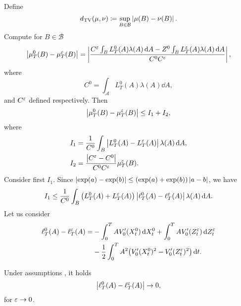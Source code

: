 \documentclass[10pt]{article}
\begin{document}
Define 
\begin{equation}
d_{\mathrm{TV}}(\mu, \nu) \coloneqq \sup_{B \in \mathcal B} \left\lvert\mu(B) - \nu(B)\right\rvert.
\end{equation}
Compute for $B \in \mathcal B$ 
\begin{equation}
\left\lvert\mu_T^0(B) - \mu_T^\varepsilon(B)\right\rvert = \left\lvert\frac{C^\varepsilon \int_B L_T^0(A) \lambda(A) \,\mathrm{d} A - Z^0 \int_B L_T^\varepsilon(A) \lambda(A) \,\mathrm{d} A}{C^0 C^\varepsilon}\right\rvert,
\end{equation}
where
\begin{equation}
C^0 = \int_{\mathcal A} L_T^0(A) \lambda(A) \dd A,
\end{equation}
and $C^\varepsilon$ defined respectively. Then
\begin{equation}
\left\lvert\mu_T^0(B) - \mu_T^\varepsilon(B)\right\rvert \leq I_1 + I_2, 
\end{equation}
where
\begin{equation}
\begin{aligned}
I_1 &= \frac{1}{C^0} \int_B \left\lvert L_T^0(A) - L_T^\varepsilon(A)\right\rvert \lambda(A) \,\mathrm{d} A, \\
I_2 &= \frac{\left\lvert C^\varepsilon - C^0\right\rvert}{C^0 C^\varepsilon} \mu_T^\varepsilon(B).
\end{aligned}
\end{equation}
Consider first $I_1$. Since $\left\lvert\exp(a) - \exp(b)\right\rvert \leq (\exp(a)+ \exp(b)) \left\lvert a - b\right\rvert$, we have
\begin{equation}
I_1 \leq \frac{1}{C^0} \int_B \big(L_T^0(A) + L_T^\varepsilon(A)\big)\left\lvert\ell_T^0(A) - \ell_T^\varepsilon(A)\right\rvert \lambda(A) \,\mathrm{d} A.
\end{equation}
Let us consider
\begin{equation}
\begin{aligned}
\ell_T^0(A) - \ell_T^\varepsilon(A) = &- \int_0^T A V_0'(X_t^0) \,\mathrm{d} X_t^0 + \int_0^T A V_0'(Z^\varepsilon_t) \,\mathrm{d} Z^\varepsilon_t \\
&- \frac12 \int_0^T A^2 \big(V_0'(X_t^0)^2 - V_0'(Z^\varepsilon_t)^2\big) \,\mathrm{d} t.
\end{aligned}
\end{equation}

\begin{lemma} Under assumptions , it holds
	\begin{equation}
		\left\lvert\ell_T^0(A) - \ell_T^\varepsilon(A)\right\rvert \to 0,
	\end{equation}
	for $\varepsilon \to 0$.
\end{lemma}
\end{document}
